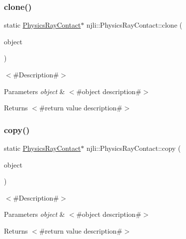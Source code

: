 \subsubsection{\texorpdfstring{clone()}{clone()}}
{\footnotesize\ttfamily static \mbox{\hyperlink{classnjli_1_1_physics_ray_contact}{Physics\+Ray\+Contact}}$\ast$ njli\+::\+Physics\+Ray\+Contact\+::clone (\begin{DoxyParamCaption}\item[{const \mbox{\hyperlink{classnjli_1_1_physics_ray_contact}{Physics\+Ray\+Contact}} \&}]{object }\end{DoxyParamCaption})\hspace{0.3cm}{\ttfamily [static]}}

$<$\#\+Description\#$>$


\begin{DoxyParams}{Parameters}
{\em object} & $<$\#object description\#$>$\\
\hline
\end{DoxyParams}
\begin{DoxyReturn}{Returns}
$<$\#return value description\#$>$ 
\end{DoxyReturn}
\mbox{\label{classnjli_1_1_physics_ray_contact_aba4cb7f93abc0faacee4f600760405b3}} 
\subsubsection{\texorpdfstring{copy()}{copy()}}
{\footnotesize\ttfamily static \mbox{\hyperlink{classnjli_1_1_physics_ray_contact}{Physics\+Ray\+Contact}}$\ast$ njli\+::\+Physics\+Ray\+Contact\+::copy (\begin{DoxyParamCaption}\item[{const \mbox{\hyperlink{classnjli_1_1_physics_ray_contact}{Physics\+Ray\+Contact}} \&}]{object }\end{DoxyParamCaption})\hspace{0.3cm}{\ttfamily [static]}}

$<$\#\+Description\#$>$


\begin{DoxyParams}{Parameters}
{\em object} & $<$\#object description\#$>$\\
\hline
\end{DoxyParams}
\begin{DoxyReturn}{Returns}
$<$\#return value description\#$>$ 
\end{DoxyReturn}
\mbox{\label{classnjli_1_1_physics_ray_contact_a83a8876ae63b92804004cf3febe76573}} 
